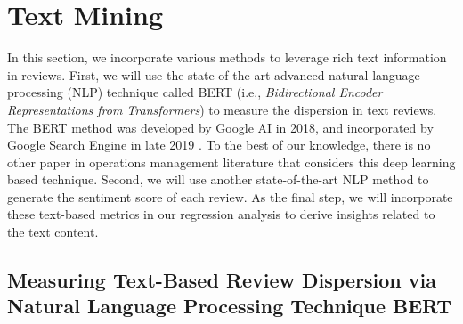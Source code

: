 \documentclass[mnsc,blindrev]{informs3}
\begin{document}
	
\section{Text Mining}\label{Sec: TextMining}

	
	In this section, we incorporate various methods to leverage rich text information in reviews.  First, we will use the state-of-the-art advanced natural language processing (NLP) technique called BERT (i.e., \textit{Bidirectional Encoder Representations from Transformers}) to measure the dispersion in text reviews. The BERT method was developed by Google AI in 2018, and incorporated by  Google Search Engine in late 2019 \citep{devlin2018bert,BERT}. To the best of our knowledge, there is no other paper in operations management literature that considers this deep learning based technique. Second, we will use another state-of-the-art NLP method to generate the sentiment score of each review. As the final step, we will incorporate these text-based metrics in our regression analysis to derive insights related to the text content.
	
\subsection{Measuring Text-Based Review Dispersion via Natural Language Processing Technique BERT} \label{Subsec: Define Txt Ent}
	
\end{document}
